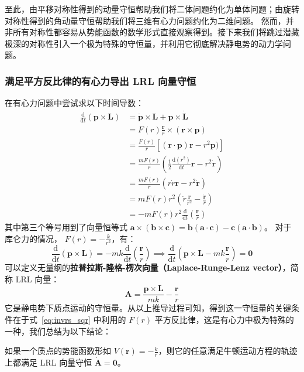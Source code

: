 \documentclass[cn,10pt,math=newtx,citestyle=gb7714-2015,bibstyle=gb7714-2015]{elegantbook}
\def\bm{\boldsymbol}
\def\d{\mathrm d}
\begin{document}
至此，由平移对称性得到的动量守恒帮助我们将二体问题约化为单体问题；由旋转对称性得到的角动量守恒帮助我们将三维有心力问题约化为二维问题。
然而，并非所有对称性都容易从势能函数的数学形式直接观察得到。接下来我们将跳过潜藏极深的对称性引入一个极为特殊的守恒量，并利用它彻底解决静电势的动力学问题。

\subsubsection{满足平方反比律的有心力导出 LRL 向量守恒}
在有心力问题中尝试求以下时间导数：
\begin{align*}
    \frac{\d}{\d t}(\bm p\times\bm L) & = \dot{\bm p}\times\bm L + \bm p\times\dot{\bm L}\\
    & = F(r)\frac{\bm r}{r}\times(\bm r\times\bm p)\\
    & = \frac{F(r)}{r}[(\bm r\cdot\bm p)\bm r-r^2\bm p)]\\
    & = \frac{mF(r)}{r}\left(\frac 1 2\frac{\d(r^2)}{\d t}\bm r-r^2\dot{\bm r}\right)\\
    & = \frac{mF(r)}{r}\left(r\dot{r}\bm r-r^2\dot{\bm r}\right)\\
    & = mF(r)r^2\left(\dot r\frac{\bm r}{r^2}-\frac{\dot{\bm r}}{r}\right)\\
    & = -mF(r)r^2\frac{\d}{\d t}\left(\frac{\bm r}{r}\right)
\end{align*}
其中第三个等号用到了向量恒等式 $\bm a\times(\bm b\times\bm c)=\bm b(\bm a\cdot\bm c)-\bm c(\bm a\cdot\bm b)$。
对于库仑力的情况， $F(r) = -\frac{k}{r^2}$，有：
\begin{equation}\label{eq:invrs_sqr}
    \frac{\d}{\d t}(\bm p\times\bm L)=-mk\frac{\d}{\d t}\left(\frac{\bm r}{r}\right)\implies \frac{\d}{\d t}\left(\bm p\times\bm L - mk\frac{\bm r}{r}\right)=\bm 0
\end{equation}
可以定义无量纲的\textbf{拉普拉斯-隆格-楞次向量（Laplace-Runge-Lenz vector）}，简称 LRL 向量：
\begin{equation*}
    \bm A = \frac{\bm p\times\bm L}{mk}-\frac{\bm r}{r}
\end{equation*}
它是静电势下质点运动的守恒量。从以上推导过程可知，得到这一守恒量的关键条件在于式~\ref{eq:invrs_sqr} 中利用的 $F(r)$ 平方反比律，这是有心力中极为特殊的一种，我们总结为以下结论：
\begin{theorem}\label{thm:LRL_vctr_cnvrs}
    如果一个质点的势能函数形如 $V(\bm r)=-\frac{k}{r}$，则它的任意满足牛顿运动方程的轨迹上都满足 LRL 向量守恒 $\dot{\bm A}=\bm 0$。
\end{theorem}
\end{document}
